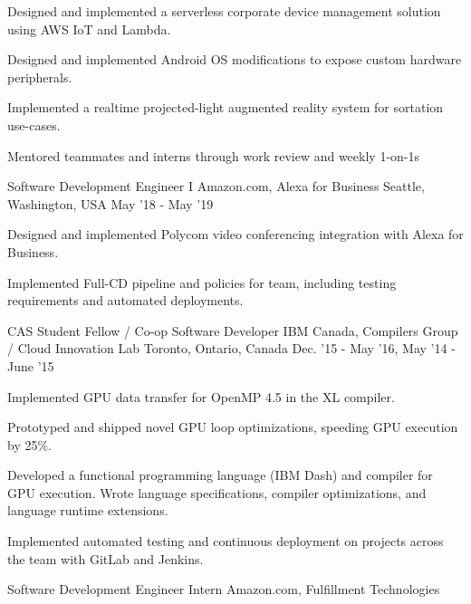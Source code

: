 \begin{cventries}
{\begin{cvitems}
            \item Designed and implemented a serverless corporate device management solution using AWS IoT and Lambda.
            \item Designed and implemented Android OS modifications to expose custom hardware peripherals.
            \item Implemented a realtime projected-light augmented reality system for sortation use-cases.
            \item Mentored teammates and interns through work review and weekly 1-on-1s
        \end{cvitems}
    }
\vspace{4mm}
\cventry
    {Software Development Engineer I} %
    {Amazon.com, Alexa for Business} %
    {Seattle, Washington, USA} %
    {May '18 - May '19} %
    {
        \begin{cvitems}
            \item Designed and implemented Polycom video conferencing integration with Alexa for Business.
            \item Implemented Full-CD pipeline and policies for team, including testing requirements and automated deployments.
        \end{cvitems}
    }
\vspace{4mm}
\cventry
    {CAS Student Fellow / Co-op Software Developer} %
    {IBM Canada, Compilers Group / Cloud Innovation Lab} %
    {Toronto, Ontario, Canada} %
    {Dec. '15 - May '16, May '14 - June '15} %
    {
        \begin{cvitems}
            \item Implemented GPU data transfer for OpenMP 4.5 in the XL compiler.
            \item Prototyped and shipped novel GPU loop optimizations, speeding GPU execution by 25\%.
            \item Developed a functional programming language (IBM Dash) and compiler for GPU execution. Wrote language specifications, compiler optimizations, and language runtime extensions.
            \item Implemented automated testing and continuous deployment on projects across the team with GitLab and Jenkins.
        \end{cvitems}
    }
\iffalse
\vspace{4mm}
\cventry
    {Software Development Engineer Intern} %
    {Amazon.com, Fulfillment Technologies} %

\end{cventries}
